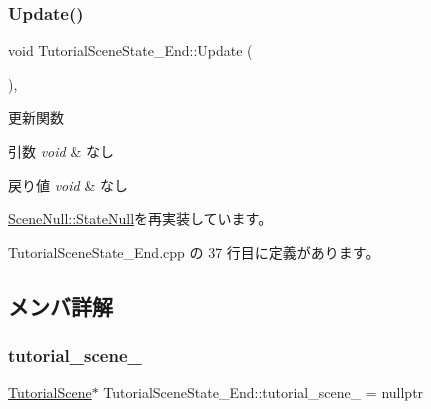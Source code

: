 \subsubsection{\texorpdfstring{Update()}{Update()}}
{\footnotesize\ttfamily void Tutorial\+Scene\+State\+\_\+\+End\+::\+Update (\begin{DoxyParamCaption}{ }\end{DoxyParamCaption})\hspace{0.3cm}{\ttfamily [override]}, {\ttfamily [virtual]}}



更新関数 


\begin{DoxyParams}{引数}
{\em void} & なし \\
\hline
\end{DoxyParams}

\begin{DoxyRetVals}{戻り値}
{\em void} & なし \\
\hline
\end{DoxyRetVals}


\mbox{\hyperlink{class_scene_null_1_1_state_null_a835f82c22afb290eca79460450088baf}{Scene\+Null\+::\+State\+Null}}を再実装しています。



 Tutorial\+Scene\+State\+\_\+\+End.\+cpp の 37 行目に定義があります。



\subsection{メンバ詳解}
\mbox{\label{class_tutorial_scene_state___end_a68f36e80b530182a5b5d835425b7e829}} 
\subsubsection{\texorpdfstring{tutorial\+\_\+scene\+\_\+}{tutorial\_scene\_}}
{\footnotesize\ttfamily \mbox{\hyperlink{class_tutorial_scene}{Tutorial\+Scene}}$\ast$ Tutorial\+Scene\+State\+\_\+\+End\+::tutorial\+\_\+scene\+\_\+ = nullptr\hspace{0.3cm}{\ttfamily [private]}}




